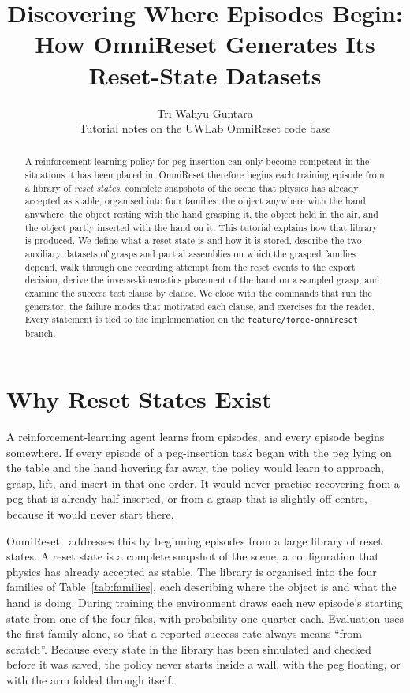 \documentclass{article}
\title{Discovering Where Episodes Begin:\\ How OmniReset Generates Its Reset-State Datasets}
\author{
  Tri Wahyu Guntara\\
  Tutorial notes on the UWLab OmniReset code base\\
}
\newcommand{\code}[1]{\texttt{#1}}
\begin{document}
\maketitle

\begin{abstract}
A reinforcement-learning policy for peg insertion can only become competent in the situations it has been placed in. OmniReset therefore begins each training episode from a library of \emph{reset states}, complete snapshots of the scene that physics has already accepted as stable, organised into four families: the object anywhere with the hand anywhere, the object resting with the hand grasping it, the object held in the air, and the object partly inserted with the hand on it. This tutorial explains how that library is produced. We define what a reset state is and how it is stored, describe the two auxiliary datasets of grasps and partial assemblies on which the grasped families depend, walk through one recording attempt from the reset events to the export decision, derive the inverse-kinematics placement of the hand on a sampled grasp, and examine the success test clause by clause. We close with the commands that run the generator, the failure modes that motivated each clause, and exercises for the reader. Every statement is tied to the implementation on the \code{feature/forge-omnireset} branch.
\end{abstract}


\section{Why Reset States Exist}
\label{sec:why}

A reinforcement-learning agent learns from episodes, and every episode begins somewhere. If every episode of a peg-insertion task began with the peg lying on the table and the hand hovering far away, the policy would learn to approach, grasp, lift, and insert in that one order. It would never practise recovering from a peg that is already half inserted, or from a grasp that is slightly off centre, because it would never start there.

OmniReset~\cite{omnireset2026} addresses this by beginning episodes from a large library of reset states. A reset state is a complete snapshot of the scene, a configuration that physics has already accepted as stable. The library is organised into the four families of Table~\ref{tab:families}, each describing where the object is and what the hand is doing. During training the environment draws each new episode's starting state from one of the four files, with probability one quarter each. Evaluation uses the first family alone, so that a reported success rate always means ``from scratch''. Because every state in the library has been simulated and checked before it was saved, the policy never starts inside a wall, with the peg floating, or with the arm folded through itself.
\end{document}
